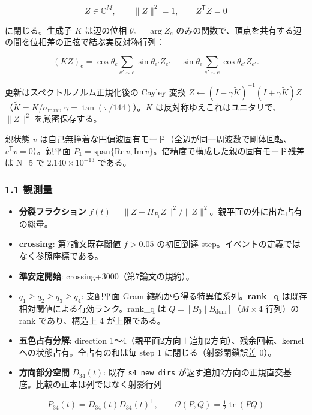 \documentclass[
  a4paper,
]{ltjsarticle}
\providecommand{\tightlist}{%
  \setlength{\itemsep}{0pt}\setlength{\parskip}{0pt}}
\begin{document}
\[Z\in\mathbb C^M,\qquad \lVert Z\rVert^2=1,\qquad Z^{\mathsf T}Z=0\]

に閉じる。生成子 \(K\) は辺の位相 \(\theta_e=\arg Z_e\)
のみの関数で、頂点を共有する辺の間を位相差の正弦で結ぶ実反対称行列：

\[(KZ)_e=\cos\theta_e\!\sum_{e'\sim e}\!\sin\theta_{e'}Z_{e'}-\sin\theta_e\!\sum_{e'\sim e}\!\cos\theta_{e'}Z_{e'}.\]

更新はスペクトルノルム正規化後の Cayley 変換
\(Z\leftarrow(I-\gamma\tilde K)^{-1}(I+\gamma\tilde K)Z\)（\(\tilde K=K/\sigma_{\max}\),
\(\gamma=\tan(\pi/144)\)）。\(K\)
は反対称ゆえこれはユニタリで、\(\lVert Z\rVert^2\) を厳密保存する。

親状態 \(v\)
は自己無撞着な円偏波固有モード（全辺が同一周波数で剛体回転、\(v^{\mathsf T}v=0\)）。親平面
\(P_1=\mathrm{span}\{\mathrm{Re}\,v,\mathrm{Im}\,v\}\)。倍精度で構成した親の固有モード残差は
N=5 で \(2.140\times10^{-13}\) である。

\subsubsection{1.1 観測量}\label{ux89b3ux6e2cux91cf}

\begin{itemize}
\tightlist
\item
  \textbf{分裂フラクション}
  \(f(t)=\lVert Z-\Pi_{P_1}Z\rVert^2/\lVert Z\rVert^2\)。親平面の外に出た占有の総量。
\item
  \textbf{crossing}: 第7論文既存閾値 \(f>0.05\) の初回到達
  step。イベントの定義ではなく参照座標である。
\item
  \textbf{準安定開始}: crossing+3000（第7論文の規約）。
\item
  \textbf{\(q_1\ge q_2\ge q_3\ge q_4\)}: 支配平面 Gram
  縮約から得る特異値系列。\textbf{rank\_q}
  は既存相対閾値による有効ランク。rank\_q は
  \(Q=[B_0\mid B_{\mathrm{dom}}]\)（\(M\times4\) 行列）の rank
  であり、構造上 4 が上限である。
\item
  \textbf{五色占有分解}: direction
  1〜4（親平面2方向＋追加2方向）、残余回転、kernel
  への状態占有。全占有の和は毎 step 1 に閉じる（射影閉鎖誤差 0）。
\item
  \textbf{方向部分空間} \(D_{34}(t)\): 既存 \texttt{s4\_new\_dirs}
  が返す追加2方向の正規直交基底。比較の正本は列ではなく射影行列
\end{itemize}

\[P_{34}(t)=D_{34}(t)D_{34}(t)^{\mathsf T},\qquad \mathcal O(P,Q)=\tfrac12\operatorname{tr}(PQ)\]
\end{document}
